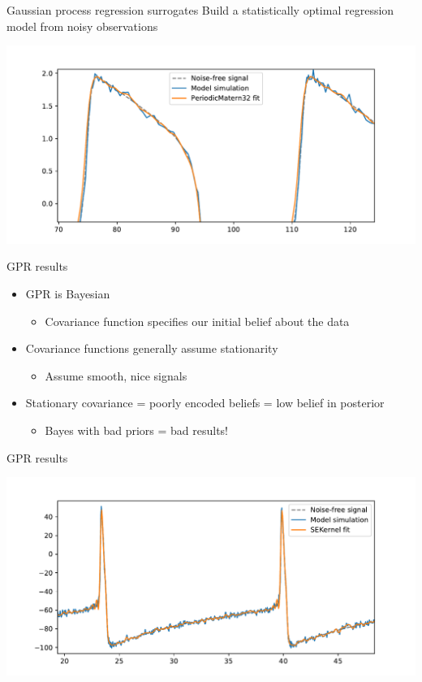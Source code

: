 \documentclass[presentation]{beamer}
\begin{document}
\begin{frame}[label={sec:org8998974}]{Gaussian process regression surrogates}
Build a statistically optimal regression model from noisy observations

\begin{center}
\includegraphics[width=.9\linewidth]{./matern.pdf}
\end{center}
\end{frame}

\begin{frame}[<+->][label={sec:orgd080198}]{GPR results}
\begin{itemize}
\item GPR is Bayesian
\begin{itemize}
\item Covariance function specifies our initial belief about the data
\end{itemize}
\item Covariance functions generally assume stationarity
\begin{itemize}
\item Assume smooth, nice signals
\end{itemize}
\item Stationary covariance = poorly encoded beliefs = low belief in posterior
\begin{itemize}
\item Bayes with bad priors = bad results!
\end{itemize}
\end{itemize}
\end{frame}

\begin{frame}[label={sec:org667e530}]{GPR results}
\begin{center}
\includegraphics[width=.9\linewidth]{./badfit.pdf}
\end{center}
\end{frame}
\end{document}
